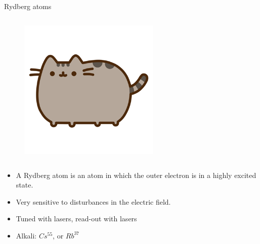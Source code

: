 \begin{columnframe}{Rydberg atoms}
    \begin{column}{0.5\textwidth}
        \begin{figure}
            \centering
            \includegraphics[width=0.6\textwidth]{images/pusheen.png}
        \end{figure}
    \end{column}
    \begin{column}{0.5\textwidth}
        \begin{itemize}
            \item A Rydberg atom is an atom in which the outer electron is in a highly excited state.
            \item Very sensitive to disturbances in the electric field.
            \item Tuned with lasers, read-out with lasers
            \item Alkali: $Cs^{55}$, or $Rb^{37}$
        \end{itemize}
    \end{column}
\end{columnframe}


